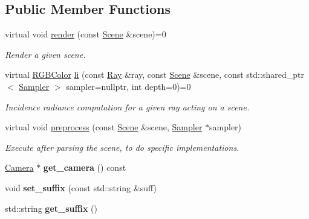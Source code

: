 \subsection*{Public Member Functions}
\begin{DoxyCompactItemize}
\item 
virtual void \mbox{\hyperlink{classomg_1_1_integrator_a9353c1a5abd1396d7c1fcd4f3e250998}{render}} (const \mbox{\hyperlink{classomg_1_1_scene}{Scene}} \&scene)=0
\begin{DoxyCompactList}\small\item\em Render a given scene. \end{DoxyCompactList}\item 
virtual \mbox{\hyperlink{namespaceomg_a7b0e3f3dcf76f2b4758c314a41885917}{R\+G\+B\+Color}} \mbox{\hyperlink{classomg_1_1_integrator_a2922583794310f6b1ff8ee121666f7a1}{li}} (const \mbox{\hyperlink{classomg_1_1_ray}{Ray}} \&ray, const \mbox{\hyperlink{classomg_1_1_scene}{Scene}} \&scene, const std\+::shared\+\_\+ptr$<$ \mbox{\hyperlink{classomg_1_1_sampler}{Sampler}} $>$ sampler=nullptr, int depth=0)=0
\begin{DoxyCompactList}\small\item\em Incidence radiance computation for a given ray acting on a scene. \end{DoxyCompactList}\item 
virtual void \mbox{\hyperlink{classomg_1_1_integrator_ac465a582d2dc3a795247f37f7edcdc47}{preprocess}} (const \mbox{\hyperlink{classomg_1_1_scene}{Scene}} \&scene, \mbox{\hyperlink{classomg_1_1_sampler}{Sampler}} $\ast$sampler)
\begin{DoxyCompactList}\small\item\em Execute after parsing the scene, to do specific implementations. \end{DoxyCompactList}\item 
\mbox{\label{classomg_1_1_integrator_a5cf412974f768257924521e74d3a80ba}} 
\mbox{\hyperlink{classomg_1_1_camera}{Camera}} $\ast$ {\bfseries get\+\_\+camera} () const
\item 
\mbox{\label{classomg_1_1_integrator_a6d8e807a4f87ee851d07aee6ebddebba}} 
void {\bfseries set\+\_\+suffix} (const std\+::string \&suff)
\item 
\mbox{\label{classomg_1_1_integrator_a0652081c509c5e21b960ce3ec51f7b03}} 
std\+::string {\bfseries get\+\_\+suffix} ()
\end{DoxyCompactItemize}
